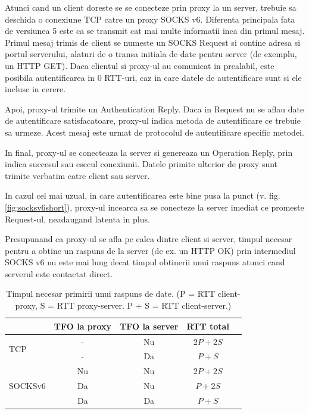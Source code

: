 Atunci cand un client doreste se se conecteze prin proxy la un server, trebuie sa deschida o conexiune TCP
catre un proxy SOCKS v6. Diferenta principala fata de versiunea 5 este ca se transmit cat mai multe informatii
inca din primul mesaj. Primul mesaj trimis de client se numeste un SOCKS Request si  contine adresa si
portul serverului, alaturi de o transa initiala de date pentru server (de exemplu, un HTTP GET).
Daca clientul si proxy-ul au comunicat in prealabil, este posibila autentificarea in 0 RTT-uri, caz in care
datele de autentificare sunt si ele incluse in cerere.

Apoi, proxy-ul trimite un Authentication Reply. Daca in Request nu se aflau date de autentificare satisfacatoare,
proxy-ul indica metoda de autentificare ce trebuie sa urmeze. Acest mesaj este urmat de protocolul de autentificare 
specific metodei.

In final, proxy-ul se conecteaza la server si genereaza un Operation Reply, prin indica succesul sau esecul conexiunii.
Datele primite ulterior de proxy sunt trimite verbatim catre client sau server.

In cazul cel mai uzual, in care autentificarea este bine pusa la punct (v. fig. \ref{fig:socksv6short}), proxy-ul
incearca sa se conecteze la server imediat ce promeste Request-ul, neadaugand latenta in plus.

Presupunand ca proxy-ul se afla pe calea dintre client si server, timpul necesar pentru a obtine un raspuns de la server
(de ex. un HTTP OK) prin intermediul SOCKS v6 nu este mai lung decat timpul obtinerii unui raspuns atunci cand serverul
este contactat direct.

\begin{table}
	\centering
	\begin{tabular}{| l | c | c | c | r |} \hline
		& TFO la proxy & TFO la server & RTT total \\ \hline
		\multirow{2}{*}{TCP} & - & Nu  & \(2P+2S\) \\ \hhline{~----}
		~ & - & Da  & \(P+S\) \\ \hline
		\multirow{3}{*}{SOCKSv6} & Nu & Nu  & \(2P + 2S\)  \\ \hhline{~----}
		~ & Da & Nu & \(P + 2S\) \\ \hhline{~----}
		~ & Da  & Da & \(P + S\) \\ \hline
	\end{tabular}
  	\caption{Timpul necesar primirii unui raspuns de date. (P = RTT client-proxy, S = RTT proxy-server. P + S = RTT client-server.)}
 \end{table}

